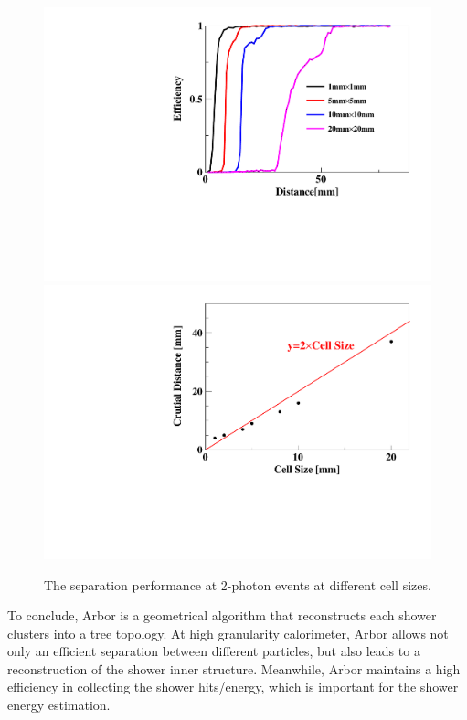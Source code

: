     




\begin{figure}[h!]
\centering
\includegraphics[scale=0.26] {Figures/Performance/zhaohang/SaperationEffeciency}
\includegraphics[scale=0.26] {Figures/Performance/zhaohang/SeperationAbility}
\caption{ The separation performance at 2-photon events at different cell sizes.}
\label{fig:seperation}
\end{figure}





To conclude, Arbor is a geometrical algorithm that reconstructs each shower clusters into a tree topology.
At high granularity calorimeter, Arbor allows not only an efficient separation between different particles,
but also leads to a reconstruction of the shower inner structure.
Meanwhile, Arbor maintains a high efficiency in collecting the shower hits/energy,
which is important for the shower energy estimation. 

